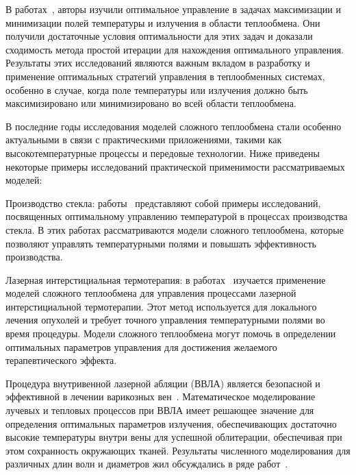     В работах~\cite{end2011analytical, asllanaj2003existence}, авторы изучили
    оптимальное управление в задачах максимизации и минимизации
    полей температуры и излучения в области теплообмена.
    Они получили достаточные условия оптимальности для этих задач и доказали
    сходимость метода простой итерации для нахождения оптимального управления.
    Результаты этих исследований являются важным вкладом в разработку и применение
    оптимальных стратегий управления в теплообменных системах, особенно в случае,
    когда поле температуры или излучения должно быть максимизировано или минимизировано во всей области теплообмена.

    В последние годы исследования моделей сложного теплообмена стали особенно
    актуальными в связи с практическими приложениями, такими
    как высокотемпературные процессы и передовые технологии.
    Ниже приведены некоторые примеры исследований практической применимости рассматриваемых моделей:

    Производство стекла: работы~\cite{frank2010optimal, clever2012optimal} представляют
    собой примеры исследований, посвященных оптимальному
    управлению температурой в процессах производства стекла.
    В этих работах рассматриваются модели сложного теплообмена, которые позволяют управлять
    температурными полями и повышать эффективность производства.

    Лазерная интерстициальная термотерапия: в работах~\cite{Tse2012, Hubner2017}
    изучается применение моделей сложного теплообмена для
    управления процессами лазерной интерстициальной термотерапии.
    Этот метод используется для локального лечения опухолей и
    требует точного управления температурными полями во время процедуры.
    Модели сложного теплообмена могут помочь в определении оптимальных
    параметров управления для достижения желаемого терапевтического эффекта.

    Процедура внутривенной лазерной абляции (ВВЛА) является безопасной и эффективной
    в лечении варикозных вен~\cite{Endovenous_vandenBos2009}.
    Математическое моделирование лучевых и тепловых процессов при ВВЛА
    имеет решающее значение для определения оптимальных параметров
    излучения, обеспечивающих достаточно высокие
    температуры внутри вены для успешной облитерации,
    обеспечивая при этом сохранность окружающих тканей.
    Результаты численного моделирования для различных
    длин волн и диаметров жил обсуждались в ряде работ~\cite{
        Opticalthermal_vanRuijven2014, Some_Poluektova2014,
        Endovenous_Malskat2014, Mathematical_Mordon2006}.


